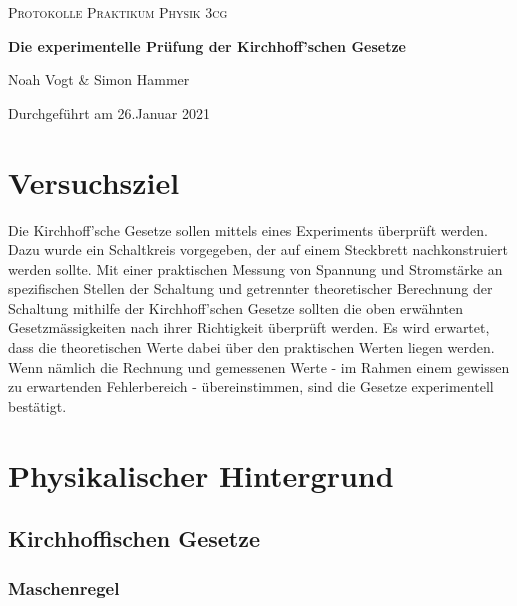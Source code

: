 \documentclass[a4paper,12pt]{article}
\begin{document}
\begin{titlepage}

\vspace*{1cm}
	\centering
	
	{\scshape\Large Protokolle Praktikum Physik 3cg \par}
	\vspace{0.5cm}
	{\huge\bfseries Die experimentelle Prüfung der Kirchhoff'schen Gesetze\par}
	\vspace{0.5cm}
	{\Large Noah Vogt \& Simon Hammer\par}
	\vspace{17cm}

	{\large Durchgeführt am 26.Januar 2021\par}
	
\end{titlepage}

\tableofcontents
\pagebreak

\section{Versuchsziel}
Die Kirchhoff'sche Gesetze sollen mittels eines Experiments überprüft werden. Dazu wurde ein Schaltkreis vorgegeben, der auf einem Steckbrett nachkonstruiert werden sollte. Mit einer praktischen Messung von Spannung und Stromstärke an spezifischen Stellen der Schaltung und getrennter theoretischer Berechnung der Schaltung mithilfe der Kirchhoff'schen Gesetze sollten die oben erwähnten Gesetzmässigkeiten nach ihrer Richtigkeit überprüft werden. Es wird erwartet, dass die theoretischen Werte dabei über den praktischen Werten liegen werden.\\

Wenn nämlich die Rechnung und gemessenen Werte - im Rahmen einem gewissen zu erwartenden Fehlerbereich - übereinstimmen, sind die Gesetze experimentell bestätigt.
\section{Physikalischer Hintergrund}

\subsection{Kirchhoffischen Gesetze}
\subsubsection{Maschenregel}
\end{document}
